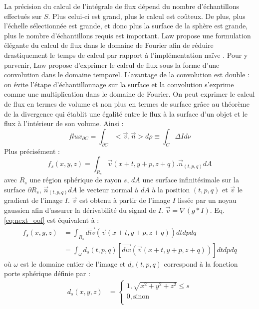   La précision du calcul de l'intégrale de flux dépend du nombre d'échantillons effectués sur $S$. Plus celui-ci est grand, plus le calcul est coûteux. De plus, plus l'échelle sélectionnée est grande, et donc plus la surface de la sphère est grande, plus le nombre d'échantillons requis est important. Law propose une formulation élégante du calcul de flux dans le domaine de Fourier afin de réduire drastiquement le temps de calcul par rapport à l'implémentation naïve \cite{Law2009_efficient_implementation}.
  Pour y parvenir, Law propose d'exprimer le calcul de flux sous la forme d'une convolution dans le domaine temporel. L'avantage de la convolution est double : on évite l'étape d'échantillonnage sur la surface et la convolution s'exprime comme une multiplication dans le domaine de Fourier. On peut exprimer le calcul de flux en termes de volume et non plus en termes de surface grâce au théorème de la divergence qui établit une égalité entre le flux à la surface d'un objet et le flux à l'intérieur de son volume. Ainsi :
  \begin{equation}
    flux_{\partial C} = \int_{\partial C}< \vec{v},\vec{n} > d\rho \equiv \int_{C }\Delta I d\nu
  \end{equation}
  Plus précisément :
  \begin{equation}
    f_s(x,y,z) = \int_{R_s}\vec{v}(x+t,y+p, z+q) . \vec{n}_{(t,p,q)}dA
    \label{eq:next_oof}
  \end{equation}
  avec $R_s$ une région sphérique de rayon $s$, $dA$ une surface infinitésimale sur la surface $\partial R_s$, $\vec{n}_{(t,p,q)}dA$ le vecteur normal à $dA$ à la position $(t,p,q)$ et $\vec{v}$ le gradient de l'image $I$. $\vec{v}$ est obtenu à partir de l'image $I$ lissée par un noyau gaussien afin d'assurer la dérivabilité du signal de $I$. $\vec{v}=\nabla(g*I)$.
  Eq. \ref{eq:next_oof} est équivalent à :
  \begin{align}
    f_s(x,y,z) & = \int_{R_s} \vec{div}( \vec{v}(x+t,y+p, z+q) ) dtdpdq \\
    & = \int_{\omega} d_s(t,p,q) [\vec{div}( \vec{v}(x+t,y+p, z+q) )] dtdpdq
  \end{align}
  où $\omega$ est le domaine entier de l'image et $d_s(t,p,q)$ correspond à la fonction porte sphérique définie par :
  \begin{align}
    d_s(x,y,z) & = \begin{cases} 
                  1, \sqrt{x^2 + y^2 + z^2} \leq s  \\
                  0, \text{sinon} \\
                \end{cases}
  \end{align}
